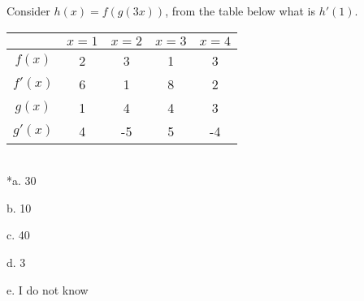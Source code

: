 
Consider \( h(x) = f(g(3x)) \), from the table below what is \( h'(1) \).

\begin{tabular}{ | c | c | c | c | c | }
\hline
 & \( x=1 \) & \( x=2 \) & \( x=3 \) & \( x=4 \) \\
\hline
\( f(x) \) & 2 & 3 & 1 & 3 \\
\hline
\( f'(x) \) & 6 & 1 & 8 & 2 \\
\hline
\( g(x) \) & 1 & 4 & 4 & 3 \\
\hline
\( g'(x) \) & 4 & -5 & 5 & -4 \\
\hline
\end{tabular}
\\

*a. 30

b. 10

c. 40

d. 3

e. I do not know \\
